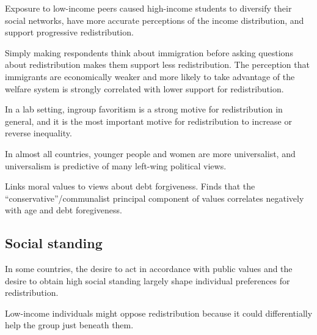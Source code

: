 \documentclass{article}
\newcommand{\citem}[1]{\medskip \noindent \textbf{\cite*{#1}}}
\begin{document}
\citem{londono2022impact}

Exposure to low-income peers caused high-income students to diversify their social networks, have more accurate perceptions of the income distribution, and support progressive redistribution.

\citem{alesina2023immigration}

Simply making respondents think about immigration before asking questions about redistribution makes them support less redistribution. The perception that immigrants are economically weaker and more likely to take advantage of the welfare system is strongly correlated with lower support for redistribution. 

\citem{fischbacher2023identity}

In a lab setting, ingroup favoritism is a strong motive for redistribution in general, and it is the most important motive for redistribution to increase or reverse inequality.

\citem{cappelen2025universalism}

In almost all countries, younger people and women are more universalist, and universalism is predictive of many left-wing political views.

\citem{paine2025attitudes}

Links moral values to views about debt forgiveness. Finds that the ``conservative''/communalist principal component of values correlates negatively with age and debt foregiveness.

\subsection{Social standing}

\citem{corneo2002individual}

In some countries, the desire to act in accordance with public values and the desire to obtain high social standing largely shape individual preferences for redistribution.

\citem{kuziemko2014last}

Low-income individuals might oppose redistribution because it could differentially help the group just beneath them.
\end{document}
